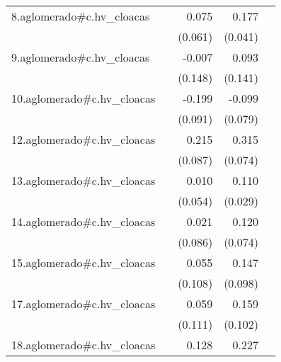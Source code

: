 {\begin{longtable}{l*{4}{D{.}{.}{-1}}}
\addlinespace
8.aglomerado#c.hv\_cloacas&                     &       0.075         &       0.177\sym{***}&                     \\
            &                     &     (0.061)         &     (0.041)         &                     \\
\addlinespace
9.aglomerado#c.hv\_cloacas&                     &      -0.007         &       0.093         &                     \\
            &                     &     (0.148)         &     (0.141)         &                     \\
\addlinespace
10.aglomerado#c.hv\_cloacas&                     &      -0.199\sym{*}  &      -0.099         &                     \\
            &                     &     (0.091)         &     (0.079)         &                     \\
\addlinespace
12.aglomerado#c.hv\_cloacas&                     &       0.215\sym{*}  &       0.315\sym{***}&                     \\
            &                     &     (0.087)         &     (0.074)         &                     \\
\addlinespace
13.aglomerado#c.hv\_cloacas&                     &       0.010         &       0.110\sym{***}&                     \\
            &                     &     (0.054)         &     (0.029)         &                     \\
\addlinespace
14.aglomerado#c.hv\_cloacas&                     &       0.021         &       0.120         &                     \\
            &                     &     (0.086)         &     (0.074)         &                     \\
\addlinespace
15.aglomerado#c.hv\_cloacas&                     &       0.055         &       0.147         &                     \\
            &                     &     (0.108)         &     (0.098)         &                     \\
\addlinespace
17.aglomerado#c.hv\_cloacas&                     &       0.059         &       0.159         &                     \\
            &                     &     (0.111)         &     (0.102)         &                     \\
\addlinespace
18.aglomerado#c.hv\_cloacas&                     &       0.128\sym{*}  &       0.227\sym{***}&                     \\

\end{longtable}}
